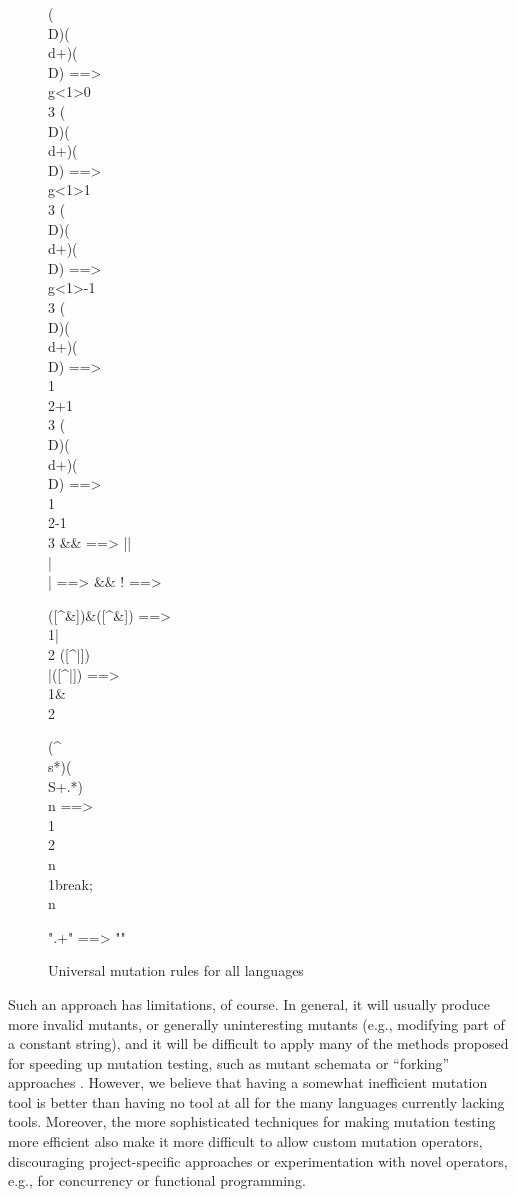 \begin{figure}
{\begin{code}
(\\D)(\\d+)(\\D) ==> \\g<1>0\\3
(\\D)(\\d+)(\\D) ==> \\g<1>1\\3
(\\D)(\\d+)(\\D) ==> \\g<1>-1\\3
(\\D)(\\d+)(\\D) ==> \\1\\2+1\\3
(\\D)(\\d+)(\\D) ==> \\1\\2-1\\3
\&\& ==> ||
\\|\\| ==> \&\&
! ==>

([^\&])\&([^\&]) ==> \\1|\\2
([^|])\\|([^|]) ==> \\1\&\\2

(^\\s*)(\\S+.*)\\n ==> \\1\\2\\n\\1break;\\n

".+" ==> ""
\end{code}
}
\caption{Universal mutation rules for all languages}
\label{fig:universal}
\end{figure}

Such an approach has limitations, of course.  In general, it will
usually produce more invalid mutants, or generally uninteresting mutants (e.g.,
modifying part of a constant string), and it will be difficult to
apply many of the methods proposed for speeding up mutation testing,
such as mutant schemata \cite{untch1993mutation} or ``forking''
approaches \cite{Equiv,TopsyTurvy}.  However, we believe that having a
somewhat inefficient mutation tool is better than having no tool at all
for the many languages currently lacking tools.  Moreover, the
more sophisticated techniques for making mutation testing more
efficient also make it more difficult to allow custom mutation
operators, discouraging project-specific approaches or experimentation
with novel operators, e.g., for concurrency or functional programming.

